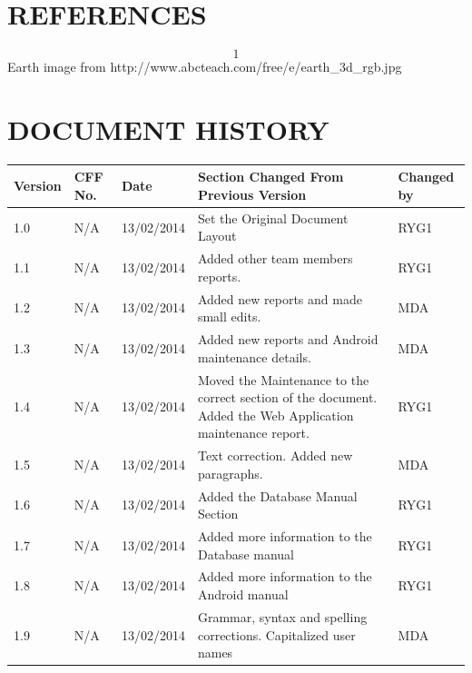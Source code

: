 \documentclass[12pt]{article}
\begin{document}
\section{REFERENCES}
\[1\]Earth image from http://www.abcteach.com/free/e/earth\_3d\_rgb.jpg

\newpage
\section{DOCUMENT HISTORY}
\setlength\LTleft{-0.5cm}
\begin{longtable}{|p{1.3cm}|p{1.5cm}|p{2cm}|p{7cm}| p{2cm}|}
\hline
	Version & CFF No. & Date & Section Changed From Previous Version & Changed by \\
\hline
	1.0&N/A&13/02/2014&Set the Original Document Layout&RYG1
 \\ 
\hline
	1.1&N/A&13/02/2014&Added other team members reports.&RYG1 \\
\hline
	1.2&N/A&13/02/2014&Added new reports and made small edits.&MDA \\
	\hline
	1.3&N/A&13/02/2014&Added new reports and Android maintenance details.&MDA \\
\hline
	1.4&N/A&13/02/2014&Moved the Maintenance to the correct section of the document. Added the Web Application maintenance report.&RYG1 \\
\hline
	1.5&N/A&13/02/2014&Text correction. Added new paragraphs.&MDA \\
\hline	
	1.6&N/A&13/02/2014&Added the Database Manual Section&RYG1 \\
\hline
	1.7&N/A&13/02/2014&Added more information to the Database manual&RYG1 \\
\hline		
	1.8&N/A&13/02/2014&Added more information to the Android manual&RYG1 \\
	\hline
	1.9&N/A&13/02/2014&Grammar, syntax and spelling corrections. Capitalized user names&MDA \\
	\hline
\end{longtable}
\end{document}

